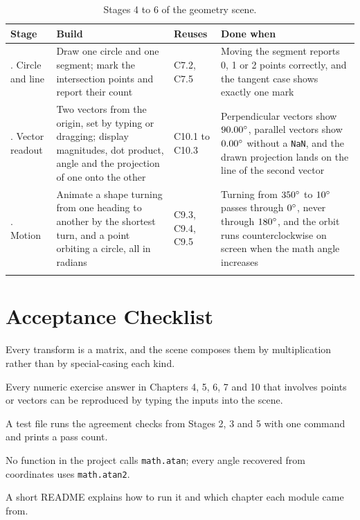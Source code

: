 \begin{table}[H]
\centering
\footnotesize
\renewcommand{\arraystretch}{1.25}
\begin{tabularx}{\textwidth}{@{}>{\raggedright\arraybackslash}p{0.85in} >{\raggedright\arraybackslash}X >{\raggedright\arraybackslash}p{0.9in} >{\raggedright\arraybackslash}X@{}}
\toprule
\textbf{Stage} & \textbf{Build} & \textbf{Reuses} & \textbf{Done when} \\
\midrule
4. Circle and line & Draw one circle and one segment; mark the intersection points and report their count & C7.2, C7.5 & Moving the segment reports 0, 1 or 2 points correctly, and the tangent case shows exactly one mark \\
5. Vector readout & Two vectors from the origin, set by typing or dragging; display magnitudes, dot product, angle and the projection of one onto the other & C10.1 to C10.3 & Perpendicular vectors show $90.00^\circ$, parallel vectors show $0.00^\circ$ without a \texttt{NaN}, and the drawn projection lands on the line of the second vector \\
6. Motion & Animate a shape turning from one heading to another by the shortest turn, and a point orbiting a circle, all in radians & C9.3, C9.4, C9.5 & Turning from $350^\circ$ to $10^\circ$ passes through $0^\circ$, never through $180^\circ$, and the orbit runs counterclockwise on screen when the math angle increases \\ \\
\bottomrule
\end{tabularx}
\caption{Stages 4 to 6 of the geometry scene.}
\end{table}

\section{Acceptance Checklist}

\begin{checklist}
\item Every transform is a matrix, and the scene composes them by multiplication rather than by special-casing each kind.
\item Every numeric exercise answer in Chapters 4, 5, 6, 7 and 10 that involves points or vectors can be reproduced by typing the inputs into the scene.
\item A test file runs the agreement checks from Stages 2, 3 and 5 with one command and prints a pass count.
\item No function in the project calls \lstinline!math.atan!; every angle recovered from coordinates uses \lstinline!math.atan2!.
\item A short README explains how to run it and which chapter each module came from.
\end{checklist}


